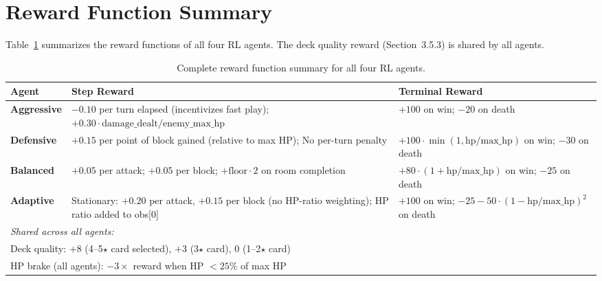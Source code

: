 \section{Reward Function Summary}
\label{app:rewards}

Table~\ref{tab:rewards_summary} summarizes the reward functions of all four RL agents. The deck quality reward (Section~3.5.3) is shared by all agents.

\begin{table}[H]
    \centering
    \caption{Complete reward function summary for all four RL agents.}
    \label{tab:rewards_summary}
    \small
    \begin{tabular}{p{2.2cm}p{4.5cm}p{4.5cm}}
        \toprule
        \textbf{Agent} & \textbf{Step Reward} & \textbf{Terminal Reward} \\
        \midrule
        \textbf{Aggressive}
        & $-0.10$ per turn elapsed (incentivizes fast play); \newline $+0.30 \cdot \text{damage\_dealt} / \text{enemy\_max\_hp}$
        & $+100$ on win; $-20$ on death \\
        \midrule
        \textbf{Defensive}
        & $+0.15$ per point of block gained (relative to max HP); \newline No per-turn penalty
        & $+100 \cdot \min(1, \text{hp}/\text{max\_hp})$ on win; $-30$ on death \\
        \midrule
        \textbf{Balanced}
        & $+0.05$ per attack; $+0.05$ per block; \newline $+\text{floor} \cdot 2$ on room completion
        & $+80 \cdot (1 + \text{hp}/\text{max\_hp})$ on win; $-25$ on death \\
        \midrule
        \textbf{Adaptive}
        & Stationary: $+0.20$ per attack, $+0.15$ per block (no HP-ratio weighting); \newline HP ratio added to obs[0]
        & $+100$ on win; $-25 - 50 \cdot (1 - \text{hp}/\text{max\_hp})^2$ on death \\
        \midrule
        \multicolumn{3}{l}{\textit{Shared across all agents:}} \\
        \multicolumn{3}{l}{Deck quality: $+8$ (4--5$\star$ card selected), $+3$ (3$\star$ card), $0$ (1--2$\star$ card)} \\
        \multicolumn{3}{l}{HP brake (all agents): $-3 \times$ reward when HP $< 25\%$ of max HP} \\
        \bottomrule
    \end{tabular}
\end{table}


